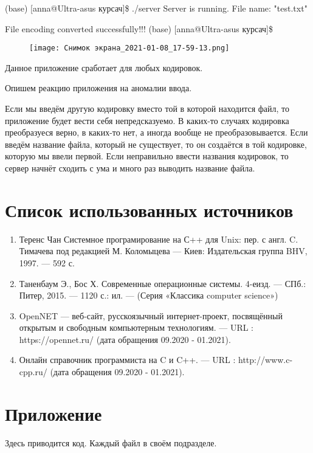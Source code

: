 \documentclass[a4paper,12pt]{extarticle}
\begin{document}
(base) [anna@Ultra-asus курсач]\$ ./server \newline
Server is running. \newline
File name: "test.txt" \newline


File encoding converted successfully!!!\newline
(base) [anna@Ultra-asus курсач]\$\newline

\begin{figure}[h!]
\centering
\texttt{[image: Снимок экрана\_2021-01-08\_17-59-13.png]}
\label{fig:cube}
\end{figure}

Данное приложение сработает для любых кодировок.

Опишем реакцию приложения на аномалии ввода.

Если мы введём другую кодировку вместо той в которой находится файл, то приложение будет вести себя непредсказуемо. В каких-то случаях кодировка преобразуеся верно, в каких-то нет, а иногда вообще не преобразовывается. Если введём название файла, который не существует, то он создаётся в той кодировке, которую мы ввели первой. Если неправильно ввести названия кодировок, то сервер начнёт сходить с ума и много раз выводить название файла. 

\section{Список использованных источников}
\begin{enumerate} 
  \item Теренс Чан Системное програмирование на С++ для Unix: пер. с англ. C. Тимачева под редакцией М. Коломыцева --- Киев: Издательская группа BHV, 1997. --- 592 с. 
  \item  Таненбаум Э., Бос Х. Современные операционные системы.  4-еизд.  —  СПб.: Питер,  2015.  —  1120  с.: ил. — (Серия «Классика computer science»)
  \item OpenNET — веб-сайт, русскоязычный интернет-проект, посвящённый открытым и свободным компьютерным технологиям.  — URL : https://opennet.ru/ (дата обращения 09.2020 - 01.2021).
  \item Онлайн справочник программиста на C и C++.  — URL : http://www.c-cpp.ru/ (дата обращения 09.2020 - 01.2021).
\end{enumerate}

\newpage

\section{Приложение}
Здесь приводится код. Каждый файл в своём подразделе.
\end{document}
